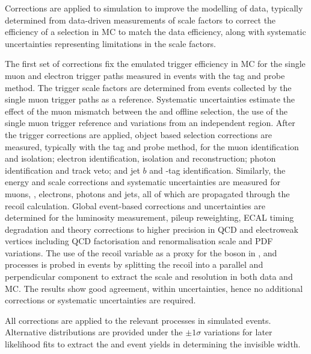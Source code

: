 Corrections are applied to simulation to improve the modelling of data, typically determined from data-driven measurements of scale factors to correct the efficiency of a selection in MC to match the data efficiency, along with systematic uncertainties representing limitations in the scale factors.

The first set of corrections fix the emulated trigger efficiency in MC for the single muon and electron trigger paths measured in \IDYll events with the tag and probe method. The \ptmiss trigger scale factors are determined from events collected by the single muon trigger paths as a reference. Systematic uncertainties estimate the effect of the muon mismatch between the \SWT and offline selection, the use of the single muon trigger reference and variations from an independent region. After the trigger corrections are applied, object based selection corrections are measured, typically with the tag and probe method, for the muon identification and isolation; electron identification, isolation and reconstruction; photon identification and track veto; and jet $b$ and \Ptauh-tag identification.  Similarly, the energy and \pt scale corrections and systematic uncertainties are measured for muons, \Ptauh, electrons, photons and jets, all of which are propagated through the recoil calculation. Global event-based corrections and uncertainties are determined for the luminosity measurement, pileup reweighting, ECAL timing degradation and theory corrections to higher precision in QCD and electroweak vertices including QCD factorisation and renormalisation scale and PDF variations. The use of the recoil variable as a proxy for the boson \pt in \IZvvj, \IWlvj and \IDYllj processes is probed in \IDYllj events by splitting the recoil into a parallel and perpendicular component to extract the scale and resolution in both data and MC. The results show good agreement, within uncertainties, hence no additional corrections or systematic uncertainties are required.

All corrections are applied to the relevant processes in simulated events. Alternative distributions are provided under the $\pm 1\sigma$ variations for later likelihood fits to extract the \IZvvj and \IZllj event yields in determining the \PZ invisible width.
